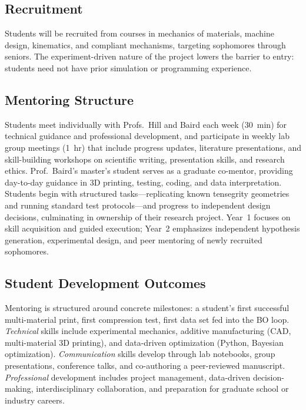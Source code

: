 \documentclass[11pt]{article}
\begin{document}
\subsection*{Recruitment}

Students will be recruited from courses in mechanics of materials, machine
design, kinematics, and compliant mechanisms, targeting sophomores through
seniors.  The experiment-driven nature of the project lowers the barrier to
entry: students need not have prior simulation or programming experience.

\subsection*{Mentoring Structure}

Students meet individually with Profs.~Hill and Baird each week (30~min) for
technical guidance and professional development, and participate in weekly lab
group meetings (1~hr) that include progress updates, literature
presentations, and skill-building workshops on scientific writing,
presentation skills, and research ethics.  Prof.~Baird's master's student
serves as a graduate co-mentor, providing day-to-day guidance in 3D printing,
testing, coding, and data interpretation.
Students begin with structured tasks---replicating known tensegrity
geometries and running standard test protocols---and progress to independent
design decisions, culminating in ownership of their research project. Year~1 focuses on skill acquisition and guided execution; Year~2 emphasizes independent hypothesis generation, experimental design, and peer mentoring of newly recruited sophomores.

\subsection*{Student Development Outcomes}

Mentoring is structured around concrete milestones:
a student's first successful multi-material print, first compression test,
first data set fed into the BO loop.  \emph{Technical} skills include
experimental mechanics, additive manufacturing (CAD, multi-material 3D printing),
and data-driven optimization (Python, Bayesian optimization).
\emph{Communication} skills develop through lab notebooks, group presentations,
conference talks, and co-authoring a peer-reviewed manuscript.
\emph{Professional} development includes project management, data-driven
decision-making, interdisciplinary collaboration, and preparation for graduate
school or industry careers.
\end{document}
